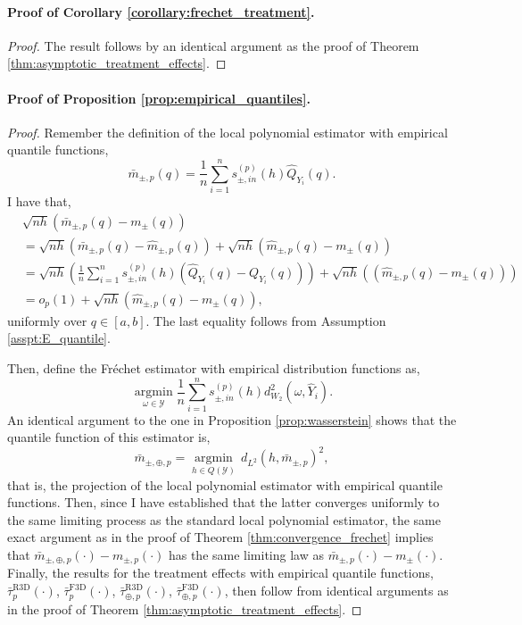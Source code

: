 \documentclass[12pt]{article}
\begin{document}
\paragraph{Proof of Corollary \ref{corollary:frechet_treatment}.} 
\begin{proof}
The result follows by an identical argument as the proof of Theorem \ref{thm:asymptotic_treatment_effects}.
\end{proof}

\paragraph{Proof of Proposition \ref{prop:empirical_quantiles}.}
\begin{proof}
Remember the definition of the local polynomial estimator with empirical quantile functions, 
\[
\bar{m}_{\pm, p}(q) = \frac{1}{n} \sum_{i=1}^n s_{ \pm, i n}^{(p)}(h) \widehat{Q}_{Y_i}(q).
\]
I have that,
\begin{align*}
& \sqrt{nh} \left( \bar{m}_{\pm, p}(q) - m_{\pm}(q) \right) \\
& = \sqrt{nh} \left(  \bar{m}_{\pm, p}(q) - \hat{m}_{\pm, p}(q)\right) +  \sqrt{nh} \left( \hat{m}_{\pm, p}(q)  - m_{\pm}(q) \right)  \\ 
& = \sqrt{nh} \left(\frac{1}{n} \sum_{i=1}^n s_{ \pm, i n}^{(p)}(h) \left( \widehat{Q}_{Y_i}(q) - Q_{Y_i}(q) \right) \right) + \sqrt{nh} \left(\left( \hat{m}_{\pm, p}(q)  - m_{\pm}(q) \right) \right) \\
& = o_p(1) + \sqrt{nh} \left( \hat{m}_{\pm, p}(q)  - m_{\pm}(q) \right) ,
\end{align*}
uniformly over $q \in [a,b]$. The last equality follows from Assumption \ref{asspt:E_quantile}.

Then, define the Fr\'echet estimator with empirical distribution functions as,
\[
\underset{\omega \in \mathcal{Y}}{\operatorname{argmin}} \frac{1}{n} \sum_{i=1}^n s_{ \pm, i n}^{(p)}(h) d_{W_2}^2\left(\omega, \hat{Y}_i\right).
\]
An identical argument to the one in Proposition \ref{prop:wasserstein} shows that the quantile function of this estimator is,
\[
\bar{m}_{\pm, \oplus, p}=\underset{h \in Q(\mathcal{Y})}{\operatorname{argmin}} \, d_{L^2}\left(h, \bar{m}_{\pm, p}\right)^2,
\]
that is, the projection of the local polynomial estimator with empirical quantile functions. Then, since I have established that the latter converges uniformly to the same limiting process as the standard local polynomial estimator, the same exact argument as in the proof of Theorem \ref{thm:convergence_frechet} implies that $\bar{m}_{\pm, \oplus, p}(\cdot) - m_{\pm, p}(\cdot)$ has the same limiting law as $\bar{m}_{\pm, p}(\cdot) - m_{\pm}(\cdot)$. Finally, the results for the treatment effects with empirical quantile functions, $\bar{\tau}^{\mathrm{R3D}}_{p}(\cdot)$, $\bar{\tau}^{\mathrm{F3D}}_{p}(\cdot)$, $\bar{\tau}^{\mathrm{R3D}}_{\oplus, p}(\cdot)$, $\bar{\tau}^{\mathrm{F3D}}_{\oplus, p}(\cdot)$, then follow from identical arguments as in the proof of Theorem \ref{thm:asymptotic_treatment_effects}.
\end{proof}
\end{document}
